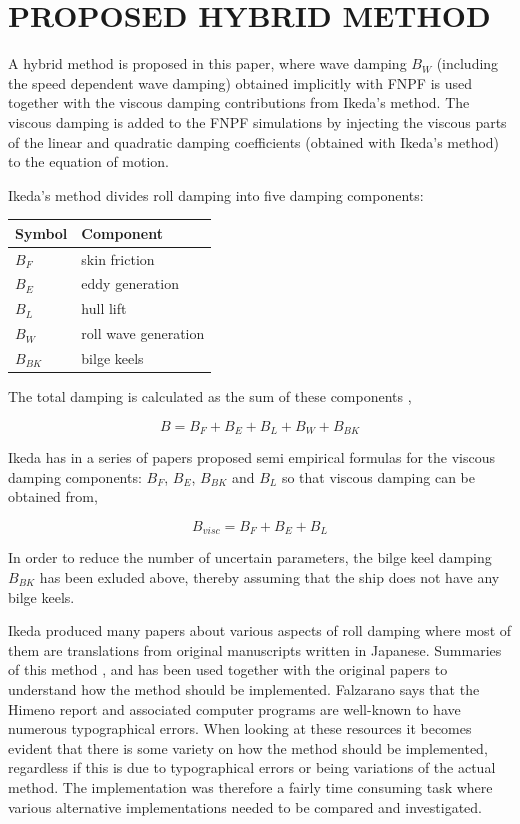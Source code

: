 \section*{PROPOSED HYBRID METHOD}\label{proposed-hybrid-method}

A hybrid method is proposed in this paper, where wave damping $B_W$
(including the speed dependent wave damping) obtained implicitly with
FNPF is used together with the viscous damping contributions from
Ikeda's method. The viscous damping is added to the FNPF simulations by
injecting the viscous parts of the linear and quadratic damping
coefficients (obtained with Ikeda's method) to the equation of motion.

Ikeda's method divides roll damping into five damping components:

\begin{longtable}[]{@{}ll@{}}
\toprule
Symbol & Component\tabularnewline
\midrule
\endhead
$B_F$ & skin friction\tabularnewline
$B_E$ & eddy generation\tabularnewline
$B_L$ & hull lift\tabularnewline
$B_W$ & roll wave generation\tabularnewline
$B_{BK}$ & bilge keels\tabularnewline
\bottomrule
\end{longtable}

The total damping is calculated as the sum of these components
\cite{7505983/937PN5DT},

\begin{equation}
B = B_F + B_E + B_L + B_W + B_{BK}
\end{equation}

Ikeda has in a series of papers proposed semi empirical formulas for the
viscous damping components: $B_F$, $B_E$, $B_{BK}$ and $B_L$ so
that viscous damping can be obtained from,

\begin{equation}
\label{eq:viscous damping}
B_{visc} = B_F + B_E + B_L
\end{equation}

In order to reduce the number of uncertain parameters, the bilge keel
damping $B_{BK}$ has been exluded above, thereby assuming that the
ship does not have any bilge keels.

Ikeda produced many papers about various aspects of roll damping where
most of them are translations from original manuscripts written in
Japanese. Summaries of this method \cite{7505983/FB64RGPF},
\cite{7505983/KAKIM2E2} and \cite{7505983/UGK6YEVD} has been used
together with the original papers to understand how the method should be
implemented. Falzarano says that the Himeno report and associated
computer programs are well-known to have numerous typographical errors.
When looking at these resources it becomes evident that there is some
variety on how the method should be implemented, regardless if this is
due to typographical errors or being variations of the actual method.
The implementation was therefore a fairly time consuming task where
various alternative implementations needed to be compared and
investigated.

